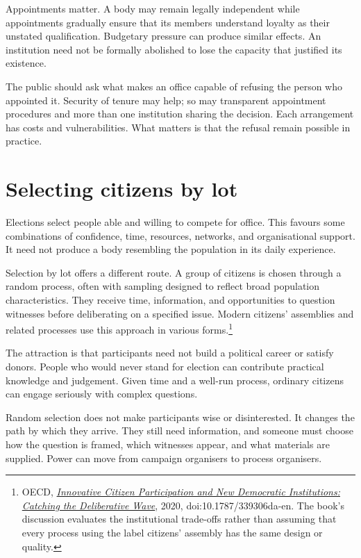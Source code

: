 \documentclass[12pt,a4paper]{book}
\begin{document}
Appointments matter. A body may remain legally independent while appointments gradually ensure that its members understand loyalty as their unstated qualification. Budgetary pressure can produce similar effects. An institution need not be formally abolished to lose the capacity that justified its existence.

The public should ask what makes an office capable of refusing the person who appointed it. Security of tenure may help; so may transparent appointment procedures and more than one institution sharing the decision. Each arrangement has costs and vulnerabilities. What matters is that the refusal remain possible in practice.

\section*{Selecting citizens by lot}

Elections select people able and willing to compete for office. This favours some combinations of confidence, time, resources, networks, and organisational support. It need not produce a body resembling the population in its daily experience.

Selection by lot offers a different route. A group of citizens is chosen through a random process, often with sampling designed to reflect broad population characteristics. They receive time, information, and opportunities to question witnesses before deliberating on a specified issue. Modern citizens' assemblies and related processes use this approach in various forms.\footnote{OECD, \href{https://www.oecd.org/en/publications/innovative-citizen-participation-and-new-democratic-institutions_339306da-en.html}{\emph{Innovative Citizen Participation and New Democratic Institutions: Catching the Deliberative Wave}}, 2020, doi:10.1787/339306da-en. The book's discussion evaluates the institutional trade-offs rather than assuming that every process using the label citizens' assembly has the same design or quality.}

The attraction is that participants need not build a political career or satisfy donors. People who would never stand for election can contribute practical knowledge and judgement. Given time and a well-run process, ordinary citizens can engage seriously with complex questions.

Random selection does not make participants wise or disinterested. It changes the path by which they arrive. They still need information, and someone must choose how the question is framed, which witnesses appear, and what materials are supplied. Power can move from campaign organisers to process organisers.
\end{document}
